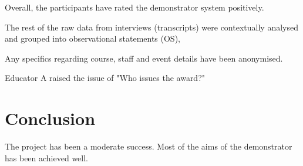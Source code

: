 Overall, the participants have rated the demonstrator system positively.

The rest of the raw data from interviews (transcripts) were contextually analysed and grouped into observational statements (OS),

Any specifics regarding course, staff and event details have been anonymised.

Educator A raised the issue of "Who issues the award?"

\section{Conclusion}

The project has been a moderate success. Most of the aims of the demonstrator has been achieved well.